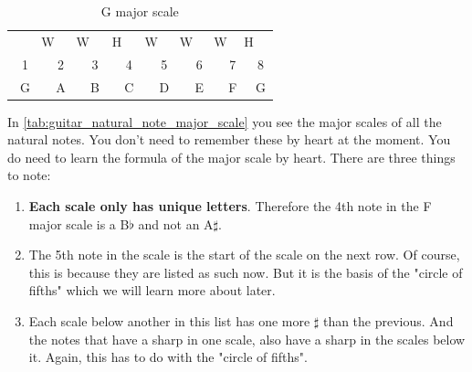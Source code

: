 \begin{table}[h]
	\centering
	\begin{tabular}{*{16}{c}}
		& \multicolumn{2}{P{4mm}}{\large{W}} & \multicolumn{2}{P{4mm}}{\large{W}} & \multicolumn{2}{P{4mm}}{\large{H}} & \multicolumn{2}{P{4mm}}{\large{W}} & \multicolumn{2}{P{4mm}}{\large{W}} & \multicolumn{2}{P{4mm}}{\large{W}} & \multicolumn{2}{P{4mm}}{\large{H}} & \\
		\multicolumn{2}{P{4mm}}{1} & \multicolumn{2}{P{4mm}}{2} & \multicolumn{2}{P{4mm}}{3} & \multicolumn{2}{P{4mm}}{4} & \multicolumn{2}{P{4mm}}{5} & \multicolumn{2}{P{4mm}}{6} & \multicolumn{2}{P{4mm}}{7} & \multicolumn{2}{P{4mm}}{8} \\
		\multicolumn{2}{P{4mm}}{G} & \multicolumn{2}{P{4mm}}{A} & \multicolumn{2}{P{4mm}}{B} & \multicolumn{2}{P{4mm}}{C} & \multicolumn{2}{P{4mm}}{D} & \multicolumn{2}{P{4mm}}{E} & \multicolumn{2}{P{4mm}}{F\sharp} & \multicolumn{2}{P{4mm}}{G}
	\end{tabular}
	\caption{G major scale}
	\label{tab:guitar_g_major_scale}
\end{table}
\fi

In \autoref{tab:guitar_natural_note_major_scale} you see the major scales of all the natural notes. You don't need to remember these by heart at the moment. You do need to learn the formula of the major scale by heart. There are three things to note:

\begin{enumerate}
	\item \textbf{Each scale only has unique letters}. Therefore the 4th note in the F major scale is a B$\flat$ and not an A$\sharp$.
	\item The 5th note in the scale is the start of the scale on the next row. Of course, this is because they are listed as such now. But it is the basis of the "circle of fifths" which we will learn more about later.
	\item Each scale below another in this list has one more $\sharp$ than the previous. And the notes that have a sharp in one scale, also have a sharp in the scales below it. Again, this has to do with the "circle of fifths".
\end{enumerate}

